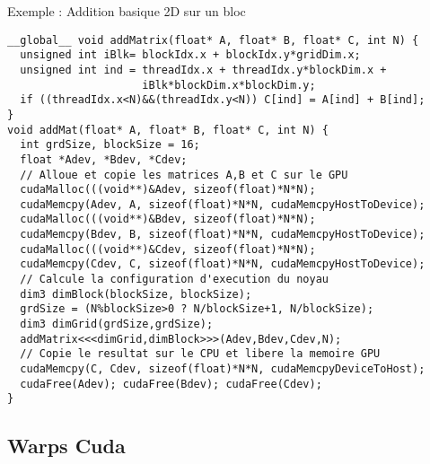 \documentclass{beamer}
\begin{document}
\begin{frame}[containsverbatim]{Exemple : Addition basique 2D sur un bloc}

{\scriptsize
\begin{lstlisting}
__global__ void addMatrix(float* A, float* B, float* C, int N) {
  unsigned int iBlk= blockIdx.x + blockIdx.y*gridDim.x;
  unsigned int ind = threadIdx.x + threadIdx.y*blockDim.x +
                     iBlk*blockDim.x*blockDim.y;
  if ((threadIdx.x<N)&&(threadIdx.y<N)) C[ind] = A[ind] + B[ind];
}
void addMat(float* A, float* B, float* C, int N) {
  int grdSize, blockSize = 16;
  float *Adev, *Bdev, *Cdev;
  // Alloue et copie les matrices A,B et C sur le GPU
  cudaMalloc(((void**)&Adev, sizeof(float)*N*N);
  cudaMemcpy(Adev, A, sizeof(float)*N*N, cudaMemcpyHostToDevice);
  cudaMalloc(((void**)&Bdev, sizeof(float)*N*N);
  cudaMemcpy(Bdev, B, sizeof(float)*N*N, cudaMemcpyHostToDevice);
  cudaMalloc(((void**)&Cdev, sizeof(float)*N*N);
  cudaMemcpy(Cdev, C, sizeof(float)*N*N, cudaMemcpyHostToDevice);
  // Calcule la configuration d'execution du noyau
  dim3 dimBlock(blockSize, blockSize);
  grdSize = (N%blockSize>0 ? N/blockSize+1, N/blockSize);
  dim3 dimGrid(grdSize,grdSize);
  addMatrix<<<dimGrid,dimBlock>>>(Adev,Bdev,Cdev,N);
  // Copie le resultat sur le CPU et libere la memoire GPU
  cudaMemcpy(C, Cdev, sizeof(float)*N*N, cudaMemcpyDeviceToHost);
  cudaFree(Adev); cudaFree(Bdev); cudaFree(Cdev);  
}
\end{lstlisting}
}
\end{frame}

\subsection{Warps Cuda}
\end{document}

